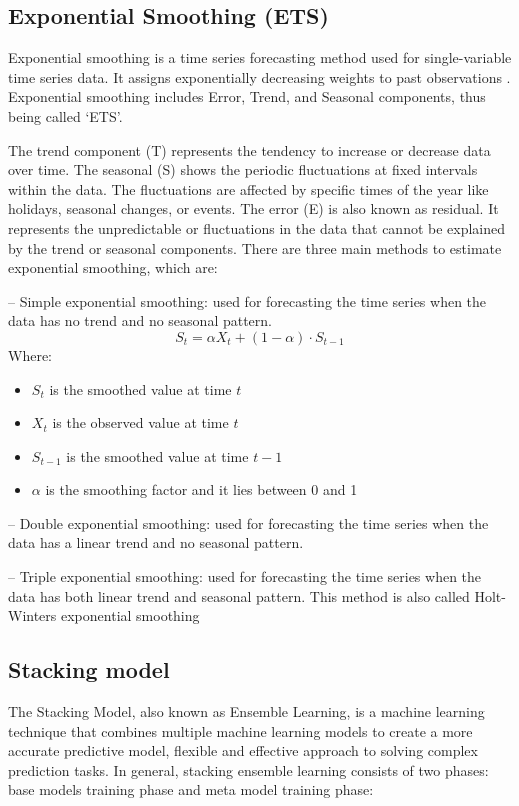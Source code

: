 \documentclass{ieeeojies}
\begin{document}
\subsection{Exponential Smoothing (ETS)}
Exponential smoothing is a time series forecasting method used for single-variable time series data. It assigns exponentially decreasing weights to past observations \cite{ets}. Exponential smoothing includes Error, Trend, and Seasonal components, thus being called ‘ETS’. 

The trend component (T) represents the tendency to increase or decrease data over time. The seasonal (S) shows the periodic fluctuations at fixed intervals within the data. The fluctuations are affected by specific times of the year like holidays, seasonal changes, or events. The error (E) is also known as residual. It represents the unpredictable or fluctuations in the data that cannot be explained by the trend or seasonal components. There are three main methods to estimate exponential smoothing, which are:
    \item[--] Simple exponential smoothing: used for forecasting the time series when the data has no trend and no seasonal pattern.
    \[ S_t = \alpha X_t + (1 - \alpha) \cdot S_{t-1} \]
    Where:
    \begin{itemize}
        \item \( S_t \) is the smoothed value at time \( t \)
        \item \( X_t \) is the observed value at time \( t \)
        \item \( S_{t-1} \) is the smoothed value at time \( t - 1 \)
        \item \( \alpha \) is the smoothing factor and it lies between 0 and 1
    \end{itemize}

    \item[--] Double exponential smoothing: used for forecasting the time series when the data has a linear trend and no seasonal pattern. \\
    \item[--] Triple exponential smoothing: used for forecasting the time series when the data has both linear trend and seasonal pattern. This method is also called Holt-Winters exponential smoothing \cite{ets_triple}

\subsection{Stacking model} 
The Stacking Model, also known as Ensemble Learning, is a machine learning technique that combines multiple machine learning models to create a more accurate predictive model, flexible and effective approach to solving complex prediction tasks. In general, stacking ensemble learning consists of two phases: base models training phase and meta model training phase:\
\end{document}
